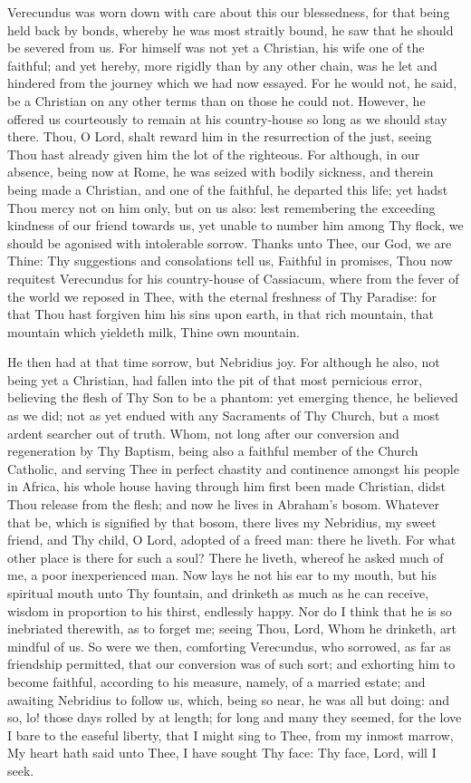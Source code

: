 \documentclass[b5paper,openright,12pt,twoside]{book}
\begin{document}
Verecundus was worn down with care about this our blessedness, for that
being held back by bonds, whereby he was most straitly bound, he saw
that he should be severed from us. For himself was not yet a Christian,
his wife one of the faithful; and yet hereby, more rigidly than by any
other chain, was he let and hindered from the journey which we had now
essayed. For he would not, he said, be a Christian on any other terms
than on those he could not. However, he offered us courteously to remain
at his country-house so long as we should stay there. Thou, O Lord,
shalt reward him in the resurrection of the just, seeing Thou hast
already given him the lot of the righteous. For although, in our
absence, being now at Rome, he was seized with bodily sickness, and
therein being made a Christian, and one of the faithful, he departed
this life; yet hadst Thou mercy not on him only, but on us also: lest
remembering the exceeding kindness of our friend towards us, yet unable
to number him among Thy flock, we should be agonised with intolerable
sorrow. Thanks unto Thee, our God, we are Thine: Thy suggestions
and consolations tell us, Faithful in promises, Thou now requitest
Verecundus for his country-house of Cassiacum, where from the fever
of the world we reposed in Thee, with the eternal freshness of Thy
Paradise: for that Thou hast forgiven him his sins upon earth, in that
rich mountain, that mountain which yieldeth milk, Thine own mountain.

He then had at that time sorrow, but Nebridius joy. For although he
also, not being yet a Christian, had fallen into the pit of that most
pernicious error, believing the flesh of Thy Son to be a phantom: yet
emerging thence, he believed as we did; not as yet endued with any
Sacraments of Thy Church, but a most ardent searcher out of truth. Whom,
not long after our conversion and regeneration by Thy Baptism, being
also a faithful member of the Church Catholic, and serving Thee in
perfect chastity and continence amongst his people in Africa, his whole
house having through him first been made Christian, didst Thou release
from the flesh; and now he lives in Abraham's bosom. Whatever that be,
which is signified by that bosom, there lives my Nebridius, my sweet
friend, and Thy child, O Lord, adopted of a freed man: there he liveth.
For what other place is there for such a soul? There he liveth, whereof
he asked much of me, a poor inexperienced man. Now lays he not his ear
to my mouth, but his spiritual mouth unto Thy fountain, and drinketh as
much as he can receive, wisdom in proportion to his thirst, endlessly
happy. Nor do I think that he is so inebriated therewith, as to forget
me; seeing Thou, Lord, Whom he drinketh, art mindful of us. So were
we then, comforting Verecundus, who sorrowed, as far as friendship
permitted, that our conversion was of such sort; and exhorting him to
become faithful, according to his measure, namely, of a married estate;
and awaiting Nebridius to follow us, which, being so near, he was all
but doing: and so, lo! those days rolled by at length; for long and many
they seemed, for the love I bare to the easeful liberty, that I might
sing to Thee, from my inmost marrow, My heart hath said unto Thee, I
have sought Thy face: Thy face, Lord, will I seek.
\end{document}
